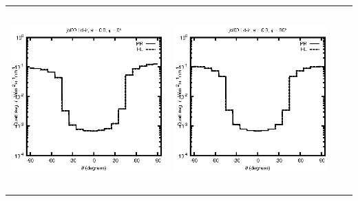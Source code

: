 \begin{tabular}{c c c c}
\includegraphics[height=7cm]{../eps/jol00_Ld_ir_fwd.eps} &
\includegraphics[height=7cm]{../eps/jol00_Ld_ir_cross.eps} \\
\end{tabular}

\pagebreak

